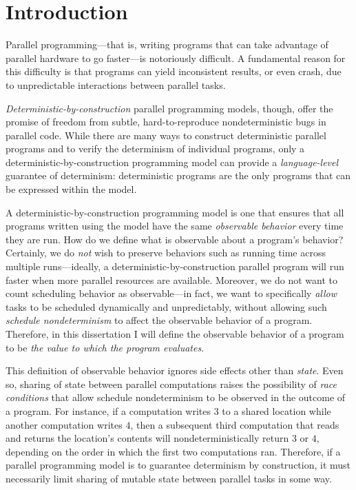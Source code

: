 \chapter{Introduction}\label{ch:intro} %

Parallel programming---that is, writing programs that can take
advantage of parallel hardware to go faster---is notoriously
difficult.  A fundamental reason for this difficulty is that programs
can yield inconsistent results, or even crash, due to unpredictable
interactions between parallel tasks.

\emph{Deterministic-by-construction} parallel programming models,
though, offer the promise of freedom from subtle, hard-to-reproduce
nondeterministic bugs in parallel code.  While there are many ways to
construct deterministic parallel programs and to verify the
determinism of individual programs, only a
deterministic-by-construction programming model can provide a
\emph{language-level} guarantee of determinism: deterministic programs
are the only programs that can be expressed within the model.

A deterministic-by-construction programming model is one that ensures
that all programs written using the model have the same
\emph{observable behavior} every time they are run.  How do we define
what is observable about a program's behavior?  Certainly, we do
\emph{not} wish to preserve behaviors such as running time across
multiple runs---ideally, a deterministic-by-construction parallel
program will run faster when more parallel resources are available.
Moreover, we do not want to count scheduling behavior as
observable---in fact, we want to specifically \emph{allow} tasks to be
scheduled dynamically and unpredictably, without allowing such
\emph{schedule nondeterminism} to affect the observable behavior of a
program.  Therefore, in this dissertation I will define the observable
behavior of a program to be \emph{the value to which the program
  evaluates}.


This definition of observable behavior ignores side effects other than
\emph{state}.  Even so, sharing of state between parallel computations
raises the possibility of \emph{race conditions} that allow schedule
nondeterminism to be observed in the outcome of a program.  For
instance, if a computation writes $3$ to a shared location while
another computation writes $4$, then a subsequent third computation
that reads and returns the location's contents will
nondeterministically return $3$ or $4$, depending on the order in
which the first two computations ran.  Therefore, if a parallel
programming model is to guarantee determinism by construction, it must
necessarily limit sharing of mutable state between parallel tasks in
some way.

